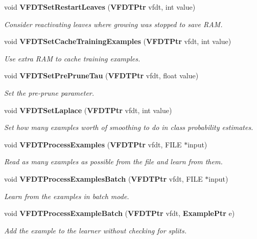 \begin{CompactItemize}
void {\bf VFDTSet\-Restart\-Leaves} ({\bf VFDTPtr} vfdt, int value)
\begin{CompactList}\small\item\em Consider reactivating leaves where growing was stopped to save RAM. \item\end{CompactList}\item 
void {\bf VFDTSet\-Cache\-Training\-Examples} ({\bf VFDTPtr} vfdt, int value)
\begin{CompactList}\small\item\em Use extra RAM to cache training examples. \item\end{CompactList}\item 
void {\bf VFDTSet\-Pre\-Prune\-Tau} ({\bf VFDTPtr} vfdt, float value)
\begin{CompactList}\small\item\em Set the pre-prune parameter. \item\end{CompactList}\item 
void {\bf VFDTSet\-Laplace} ({\bf VFDTPtr} vfdt, int value)
\begin{CompactList}\small\item\em Set how many examples worth of smoothing to do in class probability estimates. \item\end{CompactList}\item 
void {\bf VFDTProcess\-Examples} ({\bf VFDTPtr} vfdt, FILE $\ast$input)
\begin{CompactList}\small\item\em Read as many examples as possible from the file and learn from them. \item\end{CompactList}\item 
void {\bf VFDTProcess\-Examples\-Batch} ({\bf VFDTPtr} vfdt, FILE $\ast$input)
\begin{CompactList}\small\item\em Learn from the examples in batch mode. \item\end{CompactList}\item 
void {\bf VFDTProcess\-Example\-Batch} ({\bf VFDTPtr} vfdt, {\bf Example\-Ptr} e)
\begin{CompactList}\small\item\em Add the example to the learner without checking for splits. \item\end{CompactList}\item 

\end{CompactItemize}
